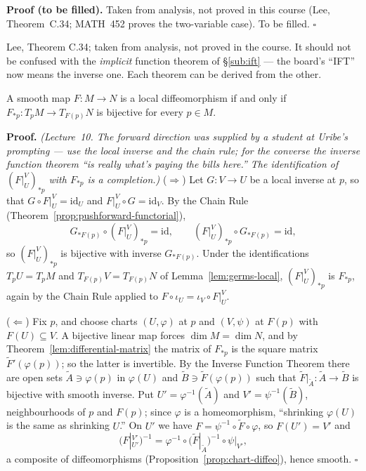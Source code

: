 \documentclass[11pt]{report}
\makeatletter
\newcounter{thmcounter}[section]
\renewenvironment{proof}[1][Proof]{\noindent\textbf{#1.} }{\hfill$\square$\par\vspace{5pt}}
\newcommand{\thmlabel}[1]{\edef\@currentlabel{\arabic{section}.\arabic{thmcounter}}\label{#1}}
\newcommand{\leeref}[1]{\par\smallskip{\raggedleft\footnotesize\textsc{Lee}:\ #1\par}}
\makeatother
\begin{document}
\begin{proof}[Proof (to be filled)]
Taken from analysis, not proved in this course (Lee, Theorem~C.34; MATH~452 proves the two-variable case). To be filled.
\end{proof}

Lee, Theorem C.34; taken from analysis, not proved in the course. It should not be confused with the \emph{implicit} function theorem of \S\ref{sub:ift} --- the board's ``IFT'' now means the inverse one. Each theorem can be derived from the other.

\begin{thmbox}\thmlabel{thm:local-diffeo-criterion}
A smooth map $F : M \to N$ is a local diffeomorphism if and only if $F_{*p} : T_pM \to T_{F(p)}N$ is bijective for every $p \in M$.
\leeref{Theorem 4.5 and Proposition 4.8}
\end{thmbox}

\begin{proof}
\textit{(Lecture~10. The forward direction was supplied by a student at Uribe's prompting --- use the local inverse and the chain rule; for the converse the inverse function theorem ``is really what's paying the bills here.'' The identification of $(F|_U^V)_{*p}$ with $F_{*p}$ is a completion.)} ($\Rightarrow$) Let $G : V \to U$ be a local inverse at $p$, so that $G \circ F|_U^V = \mathrm{id}_U$ and $F|_U^V \circ G = \mathrm{id}_V$. By the Chain Rule (Theorem~\ref{prop:pushforward-functorial}),
\[
G_{*F(p)} \circ (F|_U^V)_{*p} = \mathrm{id}, \qquad (F|_U^V)_{*p} \circ G_{*F(p)} = \mathrm{id},
\]
so $(F|_U^V)_{*p}$ is bijective with inverse $G_{*F(p)}$. Under the identifications $T_pU = T_pM$ and $T_{F(p)}V = T_{F(p)}N$ of Lemma~\ref{lem:germs-local}, $(F|_U^V)_{*p}$ is $F_{*p}$, again by the Chain Rule applied to $F \circ \iota_U = \iota_V \circ F|_U^V$.

($\Leftarrow$) Fix $p$, and choose charts $(U,\varphi)$ at $p$ and $(V,\psi)$ at $F(p)$ with $F(U) \subseteq V$. A bijective linear map forces $\dim M = \dim N$, and by Theorem~\ref{lem:differential-matrix} the matrix of $F_{*p}$ is the square matrix $\tilde F'(\varphi(p))$; so the latter is invertible. By the Inverse Function Theorem there are open sets $\tilde A \ni \varphi(p)$ in $\varphi(U)$ and $\tilde B \ni \tilde F(\varphi(p))$ such that $\tilde F|_{\tilde A} : \tilde A \to \tilde B$ is bijective with smooth inverse. Put $U' = \varphi^{-1}(\tilde A)$ and $V' = \psi^{-1}(\tilde B)$, neighbourhoods of $p$ and $F(p)$; since $\varphi$ is a homeomorphism, ``shrinking $\varphi(U)$ is the same as shrinking $U$.'' On $U'$ we have $F = \psi^{-1} \circ \tilde F \circ \varphi$, so $F(U') = V'$ and
\[
\big(F|_{U'}^{V'}\big)^{-1} = \varphi^{-1} \circ \big(\tilde F|_{\tilde A}\big)^{-1} \circ \psi|_{V'},
\]
a composite of diffeomorphisms (Proposition~\ref{prop:chart-diffeo}), hence smooth.
\end{proof}
\end{document}
